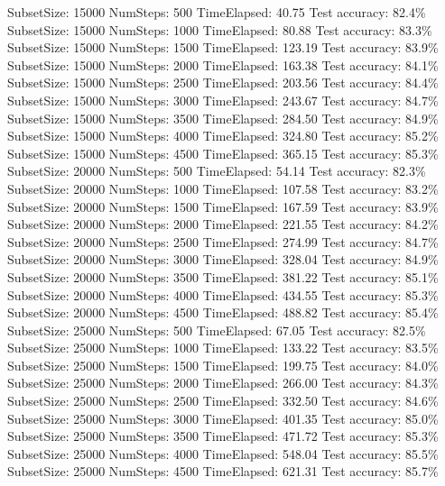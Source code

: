 \documentclass{article}
\begin{document}
\begin{itemize}
SubsetSize: 15000 NumSteps: 500 TimeElapsed: 40.75 Test accuracy: 82.4\% \\
SubsetSize: 15000 NumSteps: 1000 TimeElapsed: 80.88 Test accuracy: 83.3\% \\
SubsetSize: 15000 NumSteps: 1500 TimeElapsed: 123.19 Test accuracy: 83.9\% \\
SubsetSize: 15000 NumSteps: 2000 TimeElapsed: 163.38 Test accuracy: 84.1\% \\
SubsetSize: 15000 NumSteps: 2500 TimeElapsed: 203.56 Test accuracy: 84.4\% \\
SubsetSize: 15000 NumSteps: 3000 TimeElapsed: 243.67 Test accuracy: 84.7\% \\
SubsetSize: 15000 NumSteps: 3500 TimeElapsed: 284.50 Test accuracy: 84.9\% \\
SubsetSize: 15000 NumSteps: 4000 TimeElapsed: 324.80 Test accuracy: 85.2\% \\
SubsetSize: 15000 NumSteps: 4500 TimeElapsed: 365.15 Test accuracy: 85.3\% \\

SubsetSize: 20000 NumSteps: 500 TimeElapsed: 54.14 Test accuracy: 82.3\% \\
SubsetSize: 20000 NumSteps: 1000 TimeElapsed: 107.58 Test accuracy: 83.2\% \\
SubsetSize: 20000 NumSteps: 1500 TimeElapsed: 167.59 Test accuracy: 83.9\% \\
SubsetSize: 20000 NumSteps: 2000 TimeElapsed: 221.55 Test accuracy: 84.2\% \\
SubsetSize: 20000 NumSteps: 2500 TimeElapsed: 274.99 Test accuracy: 84.7\% \\
SubsetSize: 20000 NumSteps: 3000 TimeElapsed: 328.04 Test accuracy: 84.9\% \\
SubsetSize: 20000 NumSteps: 3500 TimeElapsed: 381.22 Test accuracy: 85.1\% \\
SubsetSize: 20000 NumSteps: 4000 TimeElapsed: 434.55 Test accuracy: 85.3\% \\
SubsetSize: 20000 NumSteps: 4500 TimeElapsed: 488.82 Test accuracy: 85.4\% \\

SubsetSize: 25000 NumSteps: 500 TimeElapsed: 67.05 Test accuracy: 82.5\% \\
SubsetSize: 25000 NumSteps: 1000 TimeElapsed: 133.22 Test accuracy: 83.5\% \\
SubsetSize: 25000 NumSteps: 1500 TimeElapsed: 199.75 Test accuracy: 84.0\% \\
SubsetSize: 25000 NumSteps: 2000 TimeElapsed: 266.00 Test accuracy: 84.3\% \\
SubsetSize: 25000 NumSteps: 2500 TimeElapsed: 332.50 Test accuracy: 84.6\% \\
SubsetSize: 25000 NumSteps: 3000 TimeElapsed: 401.35 Test accuracy: 85.0\% \\
SubsetSize: 25000 NumSteps: 3500 TimeElapsed: 471.72 Test accuracy: 85.3\% \\
SubsetSize: 25000 NumSteps: 4000 TimeElapsed: 548.04 Test accuracy: 85.5\% \\
SubsetSize: 25000 NumSteps: 4500 TimeElapsed: 621.31 Test accuracy: 85.7\% \\


\end{itemize}
\end{document}
